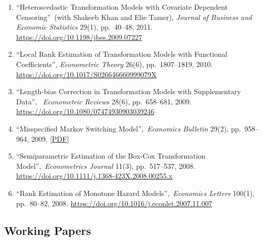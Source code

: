 \documentclass[12pt]{article}
\begin{document}
\begin{enumerate}
\item \textquotedblleft Heteroscedastic Transformation Models
with Covariate Dependent Censoring\textquotedblright\ (with Shakeeb Khan and
Elie Tamer), \textit{Journal of Business and Economic Statistics} 29(1), pp.\ 40--48,
2011. \url{https://doi.org/10.1198/jbes.2009.07227}

\item \textquotedblleft Local Rank Estimation of
Transformation Models with Functional Coefficients\textquotedblright ,
\textit{Econometric Theory} 26(6), pp.\ 1807--1819, 2010. \url{https://doi.org/10.1017/S026646660999079X}

\item \textquotedblleft Length-bias Correction in
Transformation Models with Supplementary Data\textquotedblright ,\ \textit{%
Econometric Reviews} 28(6), pp.\ 658--681, 2009. \url{https://doi.org/10.1080/07474930903039246}

\item \textquotedblleft Misspecified Markov Switching
Model\textquotedblright ,\ \textit{Economics Bulletin} 29(2), pp.\
958--964, 2009. \href{https://youngkishin.com/assets/pdf/Shin_2009_EB.pdf}{[PDF]}

\item \textquotedblleft Semiparametric Estimation of the
Box-Cox Transformation Model\textquotedblright ,\ \textit{Econometrics
Journal} 11(3), pp.\ 517--537, 2008. \url{https://doi.org/10.1111/j.1368-423X.2008.00255.x}

\item \textquotedblleft Rank Estimation of Monotone Hazard
Models\textquotedblright ,\ \textit{Economics Letters} 100(1), pp.\ 80--82, 2008. \url{https://doi.org/10.1016/j.econlet.2007.11.007}
\end{enumerate}

\subsection*{Working Papers}
\end{document}
